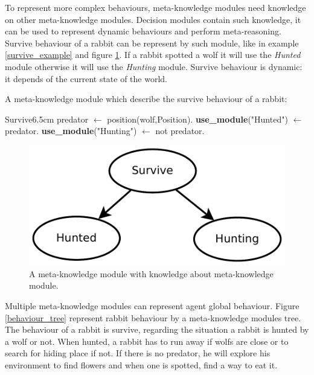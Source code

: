 \documentclass{aamas2012}
\begin{document}
	To represent more complex behaviours, meta-knowledge modules need knowledge on other meta-knowledge modules.
	Decision modules contain such knowledge, it can be used to represent dynamic behaviours and perform meta-reasoning.
	Survive behaviour of a rabbit can be represent by such module, like in example \ref{survive_example} and figure \ref{survive_figure}.
	If a rabbit spotted a wolf it will use the \emph{Hunted} module otherwise it will use the \emph{Hunting} module.
	Survive behaviour is dynamic: it depends of the current state of the world.
	
	\begin{example}
		\label{survive_example}
		A meta-knowledge module which describe the survive behaviour of a rabbit:\newline
		\begin{module}{Survive}{6.5cm}
			predator $\leftarrow$ position(wolf,Position).\newline
			\textbf{use\_module}("Hunted") $\leftarrow$ predator.\newline
			\textbf{use\_module}("Hunting") $\leftarrow$ not predator.
		\end{module}
	\end{example}
	
	\begin{figure}
		\centering
		\includegraphics[keepaspectratio=true, scale=0.4]{survive.pdf}
		\caption
		{
			\label{survive_figure}
			A meta-knowledge module with knowledge about meta-knowledge module.
		}
	\end{figure}
	
	Multiple meta-knowledge modules can represent agent global behaviour.
	Figure \ref{behaviour_tree} represent rabbit behaviour by a meta-knowledge modules tree.
	The behaviour of a rabbit is survive, regarding the situation a rabbit is hunted by a wolf or not.
	When hunted, a rabbit has to run away if wolfs are close or to search for hiding place if not.
	If there is no predator, he will explore his environment to find flowers and when one is spotted, find a way to eat it.
	
\end{document}
